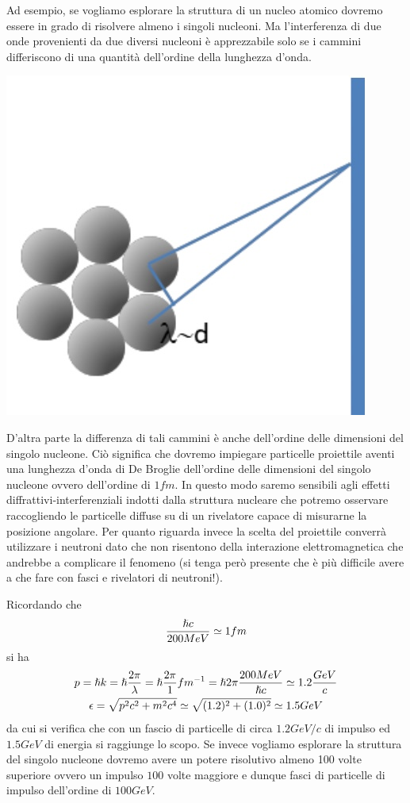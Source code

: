 Ad esempio, se vogliamo esplorare la struttura di un nucleo atomico
dovremo essere in grado di risolvere almeno i singoli nucleoni.
Ma l'interferenza di due onde provenienti da due diversi nucleoni è
apprezzabile solo se i cammini differiscono di una quantità dell'ordine
della lunghezza d'onda.
\begin{marginfigure}
	\includegraphics{figs/fascio-bersaglio-de-broglie}
	\label{fig:fascio-bersaglio-de-broglie}
\end{marginfigure}

D'altra parte la differenza di tali cammini è anche dell'ordine delle
dimensioni del singolo nucleone.
Ciò significa che dovremo impiegare
particelle proiettile aventi una lunghezza d'onda di De Broglie
dell'ordine delle dimensioni del singolo nucleone ovvero dell'ordine di
\(1 fm\).
In questo modo saremo sensibili agli effetti
diffrattivi-interferenziali indotti dalla struttura nucleare che potremo
osservare raccogliendo le particelle diffuse su di un rivelatore capace
di misurarne la posizione angolare.
Per quanto riguarda invece la scelta
del proiettile converrà utilizzare i neutroni dato che non risentono
della interazione elettromagnetica che andrebbe a complicare il fenomeno
(si tenga però presente che è più difficile avere a che fare con fasci e
rivelatori di neutroni!).

Ricordando che
\[
	\frac{\hslash c}{200 MeV}  \simeq 1 fm
\]
si ha
\begin{gather*}
	p = \hslash k = \hslash \frac{2 \pi}{\lambda} = \hslash \frac{2 \pi}{1} fm^{-1} = \hslash 2 \pi \frac{200 MeV}{\hslash c}
	\simeq 1.2 \frac{GeV}{c}\\
	\epsilon = \sqrt{p^{2} c^2+m^{2} c^4}\simeq \sqrt{(1.2)^2+(1.0)^2} \simeq 1.5 GeV
\end{gather*}
da cui si verifica che con un fascio di particelle di circa $1.2 GeV/c$ di impulso ed $1.5 GeV$ di energia si raggiunge lo scopo.
Se invece vogliamo esplorare la struttura del singolo nucleone dovremo avere un potere risolutivo almeno 100 volte superiore ovvero un impulso $100$ volte maggiore e dunque fasci di particelle di impulso dell'ordine di $100 GeV$.
